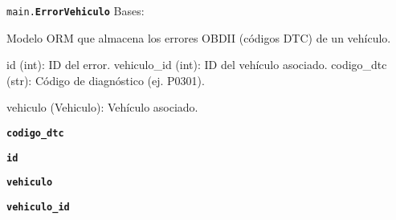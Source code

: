 \documentclass[a4paper,11pt,spanish]{sphinxmanual}
\newcommand{\robotoMonoBold}{\fontseries{b}\selectfont\ttfamily}
\renewcommand{\sphinxcode}[1]{\textcolor{sphinxorangeCode}{{\robotoMonoBold #1}}}
\renewcommand{\sphinxbfcode}[1]{\textbf{\sphinxcode{#1}}}
\renewcommand{\sphinxupquote}[1]{\texttt{#1}}
\begin{document}
\begin{fulllineitems}
\label{\detokenize{modelos:main.ErrorVehiculo}}
\pysigstartsignatures
\pysiglinewithargsret
{\sphinxbfcode{\sphinxupquote{}}\sphinxcode{\sphinxupquote{main.}}\sphinxbfcode{\sphinxupquote{ErrorVehiculo}}}
{}
{}
\pysigstopsignatures
\sphinxAtStartPar
Bases: {\hyperref[\detokenize{modelos:main.Base}]{\sphinxcrossref{\sphinxcode{\sphinxupquote{Base}}}}}

\sphinxAtStartPar
Modelo ORM que almacena los errores OBD\sphinxhyphen{}II (códigos DTC) de un vehículo.
\begin{description}
\sphinxAtStartPar
id (int): ID del error.
vehiculo\_id (int): ID del vehículo asociado.
codigo\_dtc (str): Código de diagnóstico (ej. P0301).

\sphinxAtStartPar
vehiculo (Vehiculo): Vehículo asociado.

\end{description}

\begin{fulllineitems}
\label{\detokenize{modelos:main.ErrorVehiculo.codigo_dtc}}
\pysigstartsignatures
\pysigline
{\sphinxbfcode{\sphinxupquote{codigo\_dtc}}}
\pysigstopsignatures
\end{fulllineitems}


\begin{fulllineitems}
\label{\detokenize{modelos:main.ErrorVehiculo.id}}
\pysigstartsignatures
\pysigline
{\sphinxbfcode{\sphinxupquote{id}}}
\pysigstopsignatures
\end{fulllineitems}


\begin{fulllineitems}
\label{\detokenize{modelos:main.ErrorVehiculo.vehiculo}}
\pysigstartsignatures
\pysigline
{\sphinxbfcode{\sphinxupquote{vehiculo}}}
\pysigstopsignatures
\end{fulllineitems}


\begin{fulllineitems}
\label{\detokenize{modelos:main.ErrorVehiculo.vehiculo_id}}
\pysigstartsignatures
\pysigline
{\sphinxbfcode{\sphinxupquote{vehiculo\_id}}}
\pysigstopsignatures
\end{fulllineitems}


\end{fulllineitems}
\end{document}
